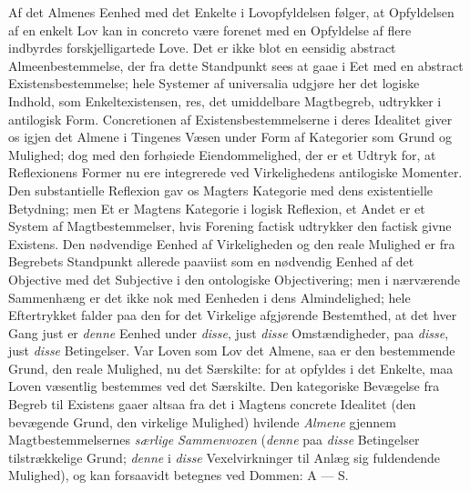 \documentclass[12pt]{book}
\newcommand{\opage}[1]{\marginnote{\footnotesize\textit{[#1]}}}
\begin{document}
Af det Almenes Eenhed med det Enkelte i Lovopfyldelsen følger, at Opfyldelsen af en enkelt Lov kan
in concreto være forenet med en Opfyldelse af flere indbyrdes forskjelligartede Love. Det er ikke
blot en eensidig abstract Almeenbestemmelse, der fra dette Standpunkt sees at gaae i Eet med en
abstract
\opage{221} Existensbestemmelse; hele Systemer af universalia udgjøre her det logiske Indhold, som
Enkeltexistensen, res, det umiddelbare Magtbegreb, udtrykker i antilogisk Form. Concretionen af
Existensbestemmelserne i deres Idealitet giver os igjen det Almene i Tingenes Væsen under Form af
Kategorier som Grund og Mulighed; dog med den forhøiede Eiendommelighed, der er et Udtryk for, at
Reflexionens Former nu ere integrerede ved Virkelighedens antilogiske Momenter. Den substantielle
Reflexion gav os Magters Kategorie med dens existentielle Betydning; men Et er Magtens Kategorie i
logisk Reflexion, et Andet er et System af Magtbestemmelser, hvis Forening factisk udtrykker den
factisk givne Existens. Den nødvendige Eenhed af Virkeligheden og den reale Mulighed er fra
Begrebets Standpunkt allerede paaviist som en nødvendig Eenhed af det Objective med det Subjective i
den ontologiske Objectivering; men i nærværende Sammenhæng er det ikke nok med Eenheden i dens
Almindelighed; hele Eftertrykket falder paa den for det Virkelige afgjørende Bestemthed, at det hver
Gang just er \emph{denne} Eenhed under \emph{disse}, just \emph{disse} Omstændigheder, paa
\emph{disse}, just \emph{disse} Betingelser. Var Loven som Lov det Almene, saa er den bestemmende
Grund, den reale Mulighed, nu det Særskilte: for at opfyldes i det Enkelte, maa Loven væsentlig
bestemmes ved det Særskilte. Den kategoriske Bevægelse fra Begreb til Existens gaaer altsaa fra det
i Magtens concrete Idealitet (den bevægende Grund, den virkelige Mulighed) hvilende \emph{Almene}
gjennem Magtbestemmelsernes \emph{særlige Sammenvoxen} (\emph{denne} paa \emph{disse} Betingelser
tilstrækkelige Grund; \emph{denne} i \emph{disse} Vexelvirkninger til Anlæg sig fuldendende
Mulighed), og kan forsaavidt betegnes ved Dommen: A --- S.
\end{document}
